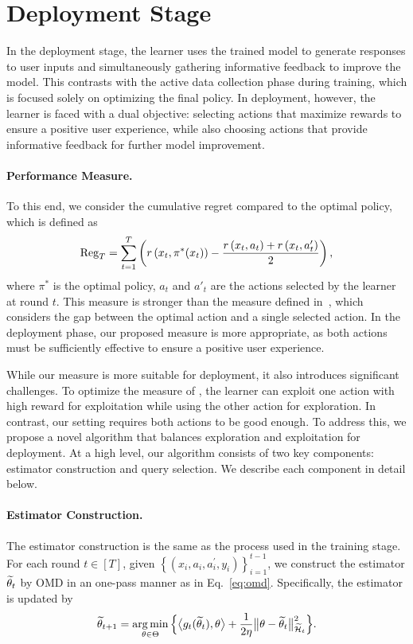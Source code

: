 \section{Deployment Stage}
\label{sec:deploy}
In the deployment stage, the learner uses the trained model to generate responses to user inputs and simultaneously gathering informative feedback to improve the model. This contrasts with the active data collection phase during training, which is focused solely on optimizing the final policy. In deployment, however, the learner is faced with a dual objective: selecting actions that maximize rewards to ensure a positive user experience, while also choosing actions that provide informative feedback for further model improvement.

\paragraph{Performance Measure.} To this end, we consider the cumulative regret compared to the optimal policy, which is defined as 
\begin{align*}
  {\operatorname*{Reg}}_T = \sum_{t=1}^T \left(r\left(x_t, \pi^*(x_t)\right)- \frac{r\left(x_t, a_t\right) + r\left(x_t, a'_t\right)}{2}\right),
\end{align*}
where $\pi^*$ is the optimal policy, $a_t$ and $a'_t$ are the actions selected by the learner at round $t$. This measure is stronger than the measure defined in~\citet{arXiv'24:Ji-RLHF-active}, which considers the gap between the optimal action and a single selected action. In the deployment phase, our proposed measure is more appropriate, as both actions must be sufficiently effective to ensure a positive user experience.

While our measure is more suitable for deployment, it also introduces significant challenges. To optimize the measure of \citet{arXiv'24:Ji-RLHF-active}, the learner can exploit one action with high reward for exploitation while using the other action for exploration. In contrast, our setting requires both actions to be good enough. To address this, we propose a novel algorithm that balances exploration and exploitation for deployment. At a high level, our algorithm consists of two key components: estimator construction and query selection. We describe each component in detail below.

\paragraph{Estimator Construction.} The estimator construction is the same as the process used in the training stage. For each round $t\in[T]$, given $\left\{\left(x_i, a_i, a_i^{\prime}, y_i\right)\right\}_{i=1}^{t-1}$, we construct the estimator $\widetilde{\theta}_t$ by OMD in an one-pass manner as in Eq.~\eqref{eq:omd}. Specifically, the estimator is updated by
\begin{align}
  \label{eq:omd-deploy}
  \widetilde{\theta}_{t+1}=\operatorname*{arg\,min}_{\theta \in \Theta} \Big\{\big\langle g_t(\widetilde{\theta}_t), \theta \big\rangle +\frac{1}{2 \eta}\big\|\theta-\widetilde{\theta}_t\big\|_{\widetilde{\mathcal{H}}_t}^2\Big\}.
\end{align}

